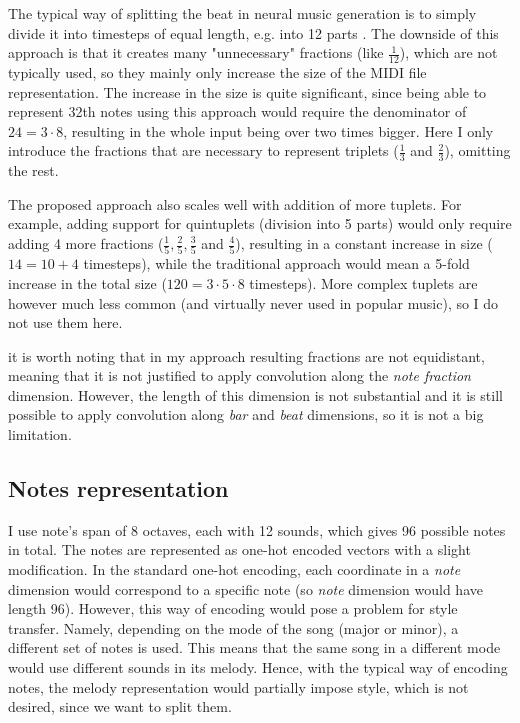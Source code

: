 \documentclass[en]{pracamgr}
\begin{document}
The typical way of splitting the beat in neural music generation is to simply divide it into timesteps of equal length, e.g. into 12 parts \cite{clara}.
The downside of this approach is that it creates many "unnecessary" fractions (like $\frac{1}{12}$), which are not typically used, so they mainly only increase the size of the MIDI file representation.
The increase in the size is quite significant, since being able to represent 32th notes using this approach would require the denominator of $24=3\cdot8$, resulting in the whole input being over two times bigger.
Here I only introduce the fractions that are necessary to represent triplets ($\frac{1}{3}$ and $\frac{2}{3}$), omitting the rest.

The proposed approach also scales well with addition of more tuplets.
For example, adding support for quintuplets (division into 5 parts) would only require adding 4 more fractions ($\frac{1}{5}, \frac{2}{5}, \frac{3}{5}$ and $\frac{4}{5}$), resulting in a constant increase in size ($14=10 + 4$ timesteps), while the traditional approach would mean a 5-fold increase in the total size ($120=3\cdot5\cdot8$ timesteps). More complex tuplets are however much less common (and virtually never used in popular music), so I do not use them here.

it is worth noting that in my approach resulting fractions are not equidistant, meaning that it is not justified to apply convolution along the \emph{note fraction} dimension.
However, the length of this dimension is not substantial and it is still possible to apply convolution along \emph{bar} and \emph{beat} dimensions, so it is not a big limitation.

\subsection{Notes representation}

I use note's span of 8 octaves, each with 12 sounds, which gives 96 possible notes in total.
The notes are represented as one-hot encoded vectors with a slight modification.
In the standard one-hot encoding, each coordinate in a \emph{note} dimension would correspond to a specific note (so \emph{note} dimension would have length 96).
However, this way of encoding would pose a problem for style transfer.
Namely, depending on the mode of the song (major or minor), a different set of notes is used.
This means that the same song in a different mode would use different sounds in its melody.
Hence, with the typical way of encoding notes, the melody representation would partially impose style, which is not desired, since we want to split them.
\end{document}
